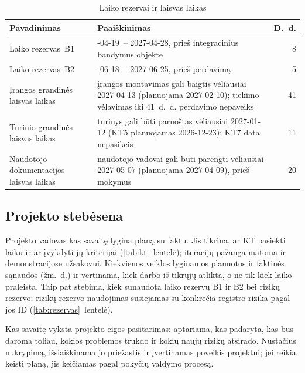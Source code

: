 \begin{table}[H]
  \centering
  \caption{Laiko rezervai ir laisvas laikas}
  \label{tab:laiko-rezervai}
  \small
  \begin{tabularx}{\textwidth}{@{}>{\raggedright\arraybackslash}p{}>{\raggedright\arraybackslash}Xr@{}}
    \toprule
    \textbf{Pavadinimas} & \textbf{Paaiškinimas} & \textbf{D.~d.} \\
    \midrule
    Laiko rezervas~B1 & 2027-04-19~-- 2027-04-28, prieš integracinius bandymus objekte & 8 \\
    Laiko rezervas~B2 & 2027-06-18~-- 2027-06-25, prieš perdavimą & 5 \\
    \midrule
    Įrangos grandinės laisvas laikas & įrangos montavimas gali baigtis vėliausiai 2027-04-13 (planuojama 2027-02-10); tiekimo vėlavimas iki 41~d.~d. perdavimo nepaveiks & 41 \\
    Turinio grandinės laisvas laikas & turinys gali būti paruoštas vėliausiai 2027-01-12 (KT5 planuojamas 2026-12-23); KT7 data nepasikeis & 11 \\
    Naudotojo dokumentacijos laisvas laikas & naudotojo vadovai gali būti parengti vėliausiai 2027-05-07 (planuojama 2027-04-09), prieš mokymus & 20 \\
    \bottomrule
  \end{tabularx}
\end{table}

\subsection{Projekto stebėsena}

Projekto vadovas kas savaitę lygina planą su faktu. Jis tikrina, ar KT
pasiekti laiku ir ar įvykdyti jų kriterijai (\ref{tab:kt}~lentelė);
iteracijų pažanga matoma ir demonstracijose užsakovui. Kiekvienos veiklos
lyginamos planuotos ir faktinės sąnaudos (žm.~d.) ir vertinama, kiek darbo
iš tikrųjų atlikta, o ne tik kiek laiko praleista. Taip pat stebima, kiek
sunaudota laiko rezervų B1 ir B2 bei rizikų rezervo; rizikų rezervo
naudojimas susiejamas su konkrečia registro rizika pagal jos ID
(\ref{tab:rezervas}~lentelė).

Kas savaitę vyksta projekto eigos pasitarimas: aptariama, kas padaryta, kas bus
daroma toliau, kokios problemos trukdo ir kokių naujų rizikų atsirado.
Nustačius nukrypimą, išsiaiškinama jo priežastis ir įvertinamas poveikis projektui; jei
reikia keisti planą, jis keičiamas pagal pokyčių valdymo procesą.

